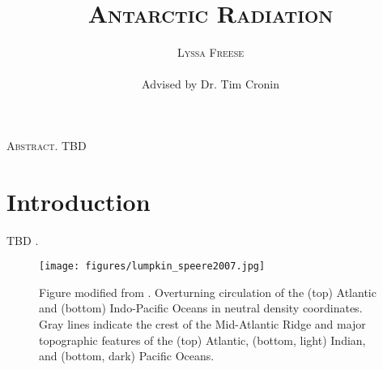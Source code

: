 \documentclass[12]{article}
\title{{\textsc{\Large Antarctic Radiation}}}
\author{\textsc{Lyssa Freese}
\\\\
Advised by Dr. Tim Cronin}
\begin{document}
\maketitle
\thispagestyle{empty}

\setlength{\leftskip}{1.1cm}
\setlength{\rightskip}{1.1cm}


\bigskip
\bigskip

{\textsc{Abstract.} 
TBD}

\bigskip
\bigskip 
\clearpage
\setcounter{page}{1}

\setlength{\leftskip}{0cm}
\setlength{\rightskip}{0cm}

\section{Introduction}
TBD
 \citep{citation ex}.



\begin{figure}[htb!]
\noindent\texttt{[image: figures/lumpkin\_speere2007.jpg]}
\centering
\caption{Figure modified from \cite{Lumpkin2007}. Overturning circulation of the (top) Atlantic and (bottom) Indo-Pacific Oceans in neutral density coordinates. Gray lines indicate the crest of the Mid-Atlantic Ridge and major topographic features of the (top) Atlantic, (bottom, light) Indian, and (bottom, dark) Pacific Oceans.}
\label{lumpkin&speere2007}
\end{figure}


\pagebreak


\end{document}
